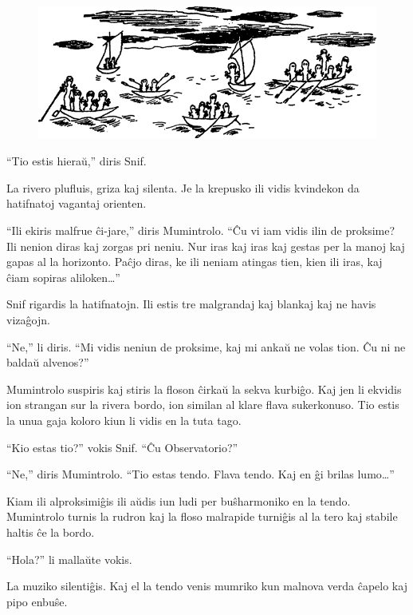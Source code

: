 \begin{figure}[htbp]
\centering
\includegraphics[width=321pt,height=125pt]{3-3.png}
\caption{}
\label{3-3}
\end{figure}

``Tio estis hieraŭ,'' diris Snif.

La rivero plufluis, griza kaj silenta. Je la krepusko ili vidis kvindekon da hatifnatoj vagantaj orienten.

``Ili ekiris malfrue ĉi-jare,'' diris Mumintrolo. ``Ĉu vi iam vidis ilin de proksime? Ili nenion diras kaj zorgas pri neniu. Nur iras kaj iras kaj gestas per la manoj kaj gapas al la horizonto. Paĉjo diras, ke ili neniam atingas tien, kien ili iras, kaj ĉiam sopiras aliloken{\ldots}''

Snif rigardis la hatifnatojn. Ili estis tre malgrandaj kaj blankaj kaj ne havis vizaĝojn.

``Ne,'' li diris. ``Mi vidis neniun de proksime, kaj mi ankaŭ ne volas tion. Ĉu ni ne baldaŭ alvenos?''

Mumintrolo suspiris kaj stiris la floson ĉirkaŭ la sekva kurbiĝo. Kaj jen li ekvidis ion strangan sur la rivera bordo, ion similan al klare flava sukerkonuso. Tio estis la unua gaja koloro kiun li vidis en la tuta tago.

``Kio estas tio?'' vokis Snif. ``Ĉu Observatorio?''

``Ne,'' diris Mumintrolo. ``Tio estas tendo. Flava tendo. Kaj en ĝi brilas lumo{\ldots}''

Kiam ili alproksimiĝis ili aŭdis iun ludi per buŝharmoniko en la tendo. Mumintrolo turnis la rudron kaj la floso malrapide turniĝis al la tero kaj stabile haltis ĉe la bordo.

``Hola?'' li mallaŭte vokis.

La muziko silentiĝis. Kaj el la tendo venis mumriko kun malnova verda ĉapelo kaj pipo enbuŝe.

